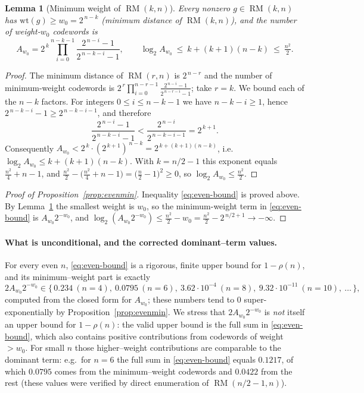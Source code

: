 \documentclass{amsart}
\newtheorem{lemma}[theorem]{Lemma}
\theoremstyle{definition}
\DeclareMathOperator{\RM}{RM}
\begin{document}
\begin{lemma}[Minimum weight of $\RM(k,n)$]\label{lem:minw}
Every nonzero $g\in\RM(k,n)$ has $\mathrm{wt}(g)\ge w_0=2^{\,n-k}$
(minimum distance of $\RM(k,n)$), and the number of weight-$w_0$ codewords
is
\[
A_{w_0}=2^{\,k}\prod_{i=0}^{n-k-1}\frac{2^{\,n-i}-1}{2^{\,n-k-i}-1},
\qquad \log_2 A_{w_0}\ \le\ k+(k+1)(n-k)\ \le\ \tfrac{n^2}{2}.
\]
\end{lemma}
\begin{proof}
The minimum distance of $\RM(r,n)$ is $2^{\,n-r}$ and the number of
minimum-weight codewords is
$2^{\,r}\prod_{i=0}^{n-r-1}\frac{2^{\,n-i}-1}{2^{\,n-r-i}-1}$; take $r=k$.
We bound each of the $n-k$ factors. For integers $0\le i\le n-k-1$ we have
$n-k-i\ge1$, hence $2^{\,n-k-i}-1\ge 2^{\,n-k-i-1}$, and therefore
\[
\frac{2^{\,n-i}-1}{2^{\,n-k-i}-1}
<\frac{2^{\,n-i}}{2^{\,n-k-i-1}}=2^{\,k+1}.
\]
Consequently $A_{w_0}<2^{\,k}\cdot(2^{\,k+1})^{\,n-k}
=2^{\,k+(k+1)(n-k)}$, i.e. $\log_2 A_{w_0}\le k+(k+1)(n-k)$. With
$k=n/2-1$ this exponent equals $\tfrac{n^2}{4}+n-1$, and
$\tfrac{n^2}{2}-\bigl(\tfrac{n^2}{4}+n-1\bigr)=\bigl(\tfrac n2-1\bigr)^2\ge0$,
so $\log_2 A_{w_0}\le\tfrac{n^2}{2}$.
\end{proof}

\begin{proof}[Proof of Proposition~\ref{prop:evenmin}]
Inequality \eqref{eq:even-bound} is proved above. By Lemma~\ref{lem:minw}
the smallest weight is $w_0$, so the minimum-weight term in
\eqref{eq:even-bound} is $A_{w_0}2^{-w_0}$, and
$\log_2(A_{w_0}2^{-w_0})\le\frac{n^2}{2}-w_0=\frac{n^2}{2}-2^{\,n/2+1}\to
-\infty$.
\end{proof}

\paragraph{What is unconditional, and the corrected dominant--term values.}
For every even $n$, \eqref{eq:even-bound} is a rigorous, finite upper bound
for $1-\rho(n)$, and its minimum--weight part is exactly
\[
2A_{w_0}2^{-w_0}\in\{\,0.234\ (n=4),\ 0.0795\ (n=6),\
3.62\cdot10^{-4}\ (n=8),\ 9.32\cdot10^{-11}\ (n=10),\ \dots\,\},
\]
computed from the closed form for $A_{w_0}$; these numbers tend to $0$
super-exponentially by Proposition~\ref{prop:evenmin}. We stress that
$2A_{w_0}2^{-w_0}$ is \emph{not} itself an upper bound for $1-\rho(n)$:
the valid upper bound is the full sum in \eqref{eq:even-bound}, which also
contains positive contributions from codewords of weight $>w_0$. For
small $n$ those higher--weight contributions are comparable to the
dominant term: e.g.\ for $n=6$ the full sum in \eqref{eq:even-bound}
equals $0.1217$, of which $0.0795$ comes from the minimum--weight
codewords and $0.0422$ from the rest (these values were verified by direct
enumeration of $\RM(n/2-1,n)$).
\end{document}
